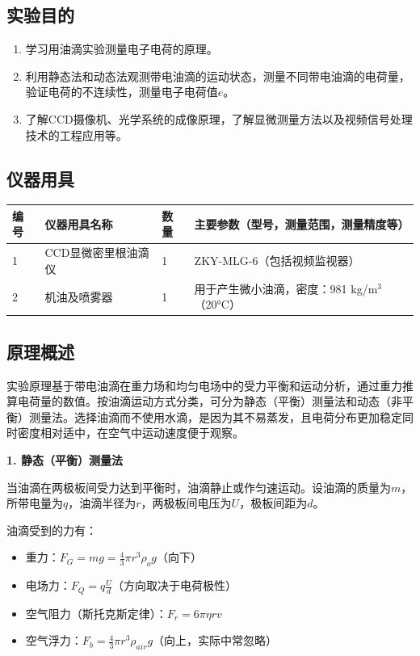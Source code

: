 \documentclass[dvipsnames, svgnames,a4paper,11pt]{article}
\begin{document}
\subsection{实验目的}
\begin{enumerate}
	\item 学习用油滴实验测量电子电荷的原理。
	\item 利用静态法和动态法观测带电油滴的运动状态，测量不同带电油滴的电荷量，验证电荷的不连续性，测量电子电荷值$e$。
	\item 了解CCD摄像机、光学系统的成像原理，了解显微测量方法以及视频信号处理技术的工程应用等。
\end{enumerate}

\subsection{仪器用具}
\begin{table}[htbp]
	\centering
	\renewcommand\arraystretch{1.6}
	\begin{tabular}{p{}|p{}|p{}|p{}}
	\hline
	编号& 仪器用具名称 & 数量 &  主要参数（型号，测量范围，测量精度等） \\
	\hline
	1&CCD显微密里根油滴仪 &1 & ZKY-MLG-6（包括视频监视器）\\

	2&机油及喷雾器 &1 & 用于产生微小油滴，密度：981 kg/m$^3$（20°C） \\
	\hline
\end{tabular}
\end{table}

\subsection{原理概述}

实验原理基于带电油滴在重力场和均匀电场中的受力平衡和运动分析，通过重力推算电荷量的数值。按油滴运动方式分类，可分为静态（平衡）测量法和动态（非平衡）测量法。选择油滴而不使用水滴，是因为其不易蒸发，且电荷分布更加稳定同时密度相对适中，在空气中运动速度便于观察。

\textbf{1. 静态（平衡）测量法}

当油滴在两极板间受力达到平衡时，油滴静止或作匀速运动。设油滴的质量为$m$，所带电量为$q$，油滴半径为$r$，两极板间电压为$U$，极板间距为$d$。

油滴受到的力有：
\begin{itemize}
	\item 重力：$F_G = mg = \frac{4}{3}\pi r^3 \rho_o g$（向下）
	\item 电场力：$F_Q = q\frac{U}{d}$（方向取决于电荷极性）
	\item 空气阻力（斯托克斯定律）：$F_r = 6\pi\eta rv$
	\item 空气浮力：$F_b = \frac{4}{3}\pi r^3 \rho_{air} g$（向上，实际中常忽略）
\end{itemize}
\end{document}
